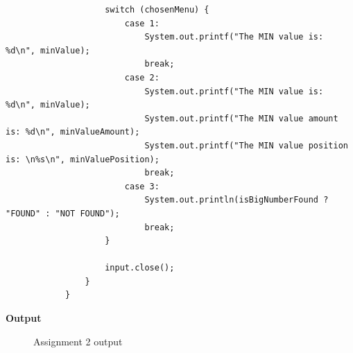 \documentclass[12pt,titlepage]{article}
\begin{document}
\begin{enumerate}
{\begin{verbatim}
                    switch (chosenMenu) {
                        case 1:
                            System.out.printf("The MIN value is: %d\n", minValue);
                            break;
                        case 2:
                            System.out.printf("The MIN value is: %d\n", minValue);
                            System.out.printf("The MIN value amount is: %d\n", minValueAmount);
                            System.out.printf("The MIN value position is: \n%s\n", minValuePosition);
                            break;
                        case 3:
                            System.out.println(isBigNumberFound ? "FOUND" : "NOT FOUND");
                            break;
                    }

                    input.close();
                }
            }

        \end{verbatim}

        \pagebreak

        \large{\textbf{Output}}
        \begin{figure}[h]
            \centering
            \caption{Assignment 2 output}
        \end{figure}
    }
\end{enumerate}
\end{document}
